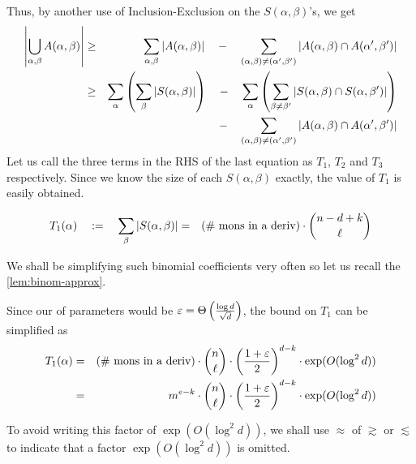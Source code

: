 Thus, by another use of Inclusion-Exclusion on the $S(\alpha, \beta)$'s, we get
\begin{eqnarray*}
\left|\bigcup_{\alpha, \beta}A(\alpha,\beta)\right|&\geq& \sum_{\alpha,\beta}\left|A(\alpha, \beta)\right| \quad - \quad \sum_{(\alpha, \beta)\neq (\alpha',\beta')}\left|A(\alpha, \beta) \cap A(\alpha',\beta')\right|\\
 & \geq & \sum_\alpha \left(\sum_\beta \left|S(\alpha, \beta)\right|\right) \quad - \quad \sum_\alpha \left(\sum_{\beta \neq \beta'}\left|S(\alpha, \beta)\cap S(\alpha,\beta')\right|\right)\\
 & & \quad\quad \quad - \quad \sum_{(\alpha, \beta)\neq (\alpha',\beta')}\left|A(\alpha, \beta) \cap A(\alpha',\beta')\right|
\end{eqnarray*}
Let us call the three terms in the RHS of the last equation as $T_1$, $T_2$ and $T_3$ respectively. 
Since we know the size of each $S(\alpha, \beta)$ exactly, the value of $T_1$ is easily obtained. 
\begin{lemma}[\cite{KS14}]\label{lem:T_1-value}
\begin{eqnarray*}
T_1(\alpha) \quad := \quad \sum_{\beta}\left|S(\alpha,\beta)\right|&=&\text{(\# mons in a deriv)} \cdot \binom{n-d+k}{\ell}
\end{eqnarray*}
\end{lemma}

\noindent
We shall be simplifying such binomial coefficients very often so let us recall the \autoref{lem:binom-approx}. 

\binomapprox*

\noindent
Since our of parameters would be $\varepsilon = \Theta\left(\frac{\log d}{\sqrt{d}}\right)$, the bound on $T_1$ can be simplified as
\begin{eqnarray*}
T_1(\alpha)  & =  &\text{(\# mons in a deriv)} \cdot \binom{n}{\ell} \cdot \left(\frac{1+\varepsilon}{2}\right)^{d-k} \cdot \exp(O(\log^2 d))\\
& = & m^{e-k}\cdot \binom{n}{\ell} \cdot \left(\frac{1+\varepsilon}{2}\right)^{d-k} \cdot \exp(O(\log^2 d))
\end{eqnarray*}
\begin{remark*}To avoid writing this factor of $\exp(O(\log^2 d))$, we shall use $\approx$ of $\gtrsim$ or $\lesssim$ to indicate that a factor $\exp(O(\log^2 d))$ is omitted. 
\end{remark*}

\bigskip

